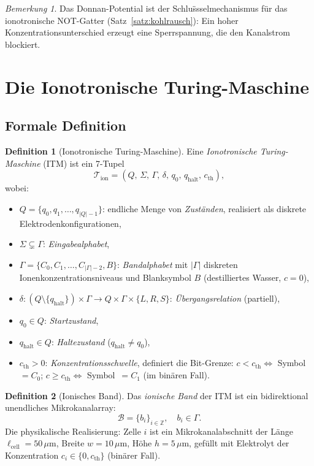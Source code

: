 ﻿\documentclass[a4paper,12pt]{article}
\theoremstyle{plain}
\theoremstyle{definition}
\newtheorem{definition}{Definition}
\theoremstyle{remark}
\newtheorem{bemerkung}{Bemerkung}
\newcommand{\ITM}{\mathcal{T}_{\mathrm{ion}}}
\newcommand{\cth}{c_{\mathrm{th}}}
\begin{document}
\begin{bemerkung}
Das Donnan-Potential ist der Schlu\"ssselmechanismus f\"ur das
ionotronische NOT-Gatter (Satz~\ref{satz:kohlrausch}):
Ein hoher Konzentrationsunterschied erzeugt eine Sperrspannung,
die den Kanalstrom blockiert.
\end{bemerkung}

\section{Die Ionotronische Turing-Maschine}

\subsection{Formale Definition}

\begin{definition}[Ionotronische Turing-Maschine]
\label{def:itm}
Eine \emph{Ionotronische Turing-Maschine} (ITM) ist ein 7-Tupel
\[
\ITM = (Q,\, \Sigma,\, \Gamma,\, \delta,\, q_0,\, q_{\mathrm{halt}},\, \cth),
\]
wobei:
\begin{itemize}
    \item $Q = \{q_0, q_1, \ldots, q_{|Q|-1}\}$: endliche Menge von
          \emph{Zust\"anden}, realisiert als diskrete Elektrodenkonfigurationen,
    \item $\Sigma \subsetneq \Gamma$: \emph{Eingabealphabet},
    \item $\Gamma = \{C_0, C_1, \ldots, C_{|\Gamma|-2}, B\}$: \emph{Bandalphabet}
          mit $|\Gamma|$ diskreten Ionenkonzentrationsniveaus und
          Blanksymbol $B$ (destilliertes Wasser, $c = 0$),
    \item $\delta: (Q \setminus \{q_{\mathrm{halt}}\}) \times \Gamma \to
          Q \times \Gamma \times \{L, R, S\}$: \emph{\"Ubergangsrelation}
          (partiell),
    \item $q_0 \in Q$: \emph{Startzustand},
    \item $q_{\mathrm{halt}} \in Q$: \emph{Haltezustand} ($q_{\mathrm{halt}} \neq q_0$),
    \item $\cth > 0$: \emph{Konzentrationsschwelle}, definiert die Bit-Grenze:
          $c < \cth \Leftrightarrow$ Symbol~$= C_0$; $c \geq \cth \Leftrightarrow$
          Symbol~$= C_1$ (im bin\"aren Fall).
\end{itemize}
\end{definition}

\begin{definition}[Ionisches Band]
\label{def:band}
Das \emph{ionische Band} der ITM ist ein bidirektional unendliches
Mikrokanalarray:
\[
\mathcal{B} = \{b_i\}_{i \in \mathbb{Z}}, \quad b_i \in \Gamma.
\]
Die physikalische Realisierung: Zelle $i$ ist ein Mikrokanalabschnitt
der L\"ange $\ell_{\mathrm{cell}} = 50\,\mu$m, Breite $w = 10\,\mu$m,
H\"ohe $h = 5\,\mu$m, gef\"ullt mit Elektrolyt der Konzentration
$c_i \in \{0, \cth\}$ (bin\"arer Fall).
\end{definition}
\end{document}
